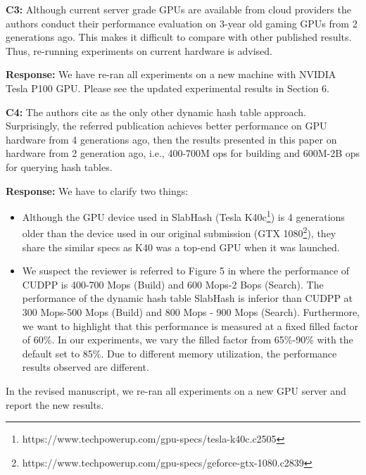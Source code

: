 \begin{shaded}
	\noindent\textbf{C3:} Although current server grade GPUs are available from cloud providers the authors conduct their performance evaluation on 3-year old gaming GPUs from 2 generations ago. This makes it difficult to compare with other published results. Thus, re-running experiments on current hardware is advised.
\end{shaded}
%
\noindent\textbf{Response:} 
We have re-ran all experiments on a new machine with NVIDIA Tesla P100 GPU. Please see the updated experimental results in Section 6.

\begin{shaded}
	\noindent\textbf{C4:} The authors cite \cite{ashkiani2018dynamic} as the only other dynamic hash table approach. Surprisingly, the referred publication achieves better performance on GPU hardware from 4 generations ago, then the results presented in this paper on hardware from 2 generation ago, i.e., 400-700M ops for building and 600M-2B ops for querying hash tables.
\end{shaded}
%
\noindent\textbf{Response:} 
We have to clarify two things: 
\begin{itemize}[noitemsep]
	\item Although the GPU device used in SlabHash \cite{ashkiani2018dynamic} (Tesla K40c\footnote{https://www.techpowerup.com/gpu-specs/tesla-k40c.c2505}) is 4 generations older than the device used in our original submission (GTX 1080\footnote{https://www.techpowerup.com/gpu-specs/geforce-gtx-1080.c2839}), they share the similar specs as K40 was a top-end GPU when it was launched. 
	\item We suspect the reviewer is referred to Figure 5 in \cite{ashkiani2018dynamic} where the performance of CUDPP is 400-700 Mops (Build) and 600 Mops-2 Bops (Search). The performance of the dynamic hash table SlabHash is inferior than CUDPP at 300 Mops-500 Mops (Build) and 800 Mops - 900 Mops (Search). Furthermore, we want to highlight that this performance is measured at a fixed filled factor of 60\%. In our experiments, we vary the filled factor from 65\%-90\% with the default set to 85\%. Due to different memory utilization, the performance results observed are different.
\end{itemize}
%
In the revised manuscript, we re-ran all experiments on a new GPU server and report the new results.

